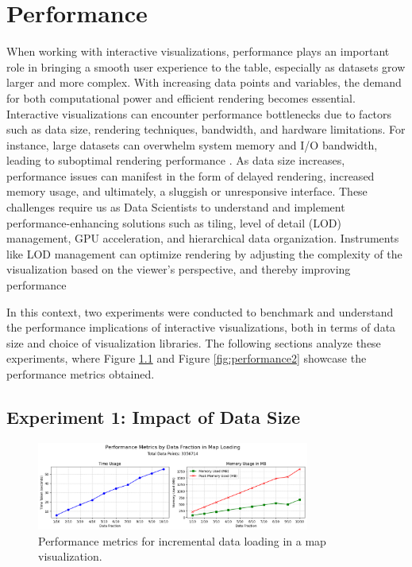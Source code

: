 \chapter{Performance}

When working with interactive visualizations, performance plays an important role in bringing a smooth user experience to the table, especially as datasets grow larger and more complex. With increasing data points and variables, the demand for both computational power and efficient rendering becomes essential. Interactive visualizations can encounter performance bottlenecks due to factors such as data size, rendering techniques, bandwidth, and hardware limitations. For instance, large datasets can overwhelm system memory and I/O bandwidth, leading to suboptimal rendering performance \cite{eilemannAnalysisParallelRendering2007}. As data size increases, performance issues can manifest in the form of delayed rendering, increased memory usage, and ultimately, a sluggish or unresponsive interface. These challenges require us as Data Scientists to understand and implement performance-enhancing solutions such as tiling, level of detail (LOD) management, GPU acceleration, and hierarchical data organization. Instruments like LOD management can optimize rendering by adjusting the complexity of the visualization based on the viewer's perspective, and thereby improving performance \cite{ripollesVisualizationLevelofdetailMeshes2011}

In this context, two experiments were conducted to benchmark and understand the performance implications of interactive visualizations, both in terms of data size and choice of visualization libraries. The following sections analyze these experiments, where Figure \ref{fig:performance1} and Figure \ref{fig:performance2} showcase the performance metrics obtained.

\section{Experiment 1: Impact of Data Size}

\begin{figure}[H]
    \centering
    \includegraphics[width=0.8\textwidth]{figures/map_performance.png}
    \caption{Performance metrics for incremental data loading in a map visualization.}
    \label{fig:performance1}
\end{figure}    

